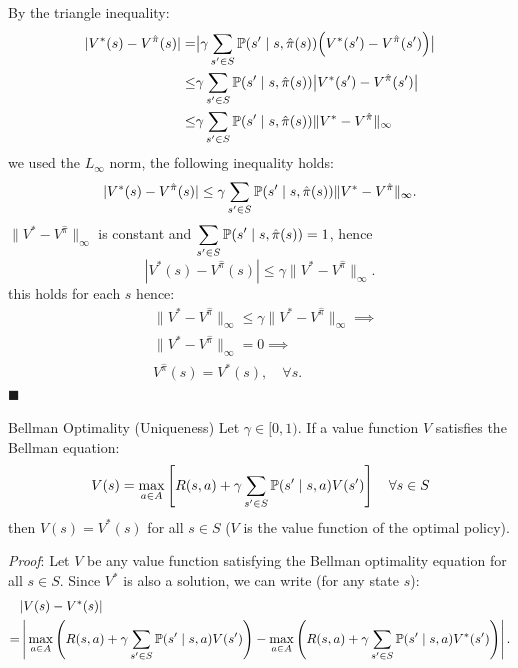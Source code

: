 \documentclass[10pt, a4paper]{report}
\begin{document}
By the triangle inequality:
\begin{align}  
     |V^*(s) - V^{\hat{\pi}}(s)| =&\big\vert{}\gamma \sum_{s' \in {S}} {\mathbb P}(s' \mid s, \hat{\pi}(s)) \Big( V^*(s') - V^{\hat{\pi}}(s') \Big)\big\vert{}\\
    \le&\gamma \sum_{s' \in {S}} {\mathbb P}(s' \mid s, \hat{\pi}(s)) \big\vert{} V^*(s') - V^{\hat{\pi}}(s')\big\vert{}\\ 
    \le&\gamma \sum_{s' \in {S}} {\mathbb P}(s' \mid s, \hat{\pi}(s)) \| V^* - V^{\hat{\pi}}\|_\infty
\end{align}
we used the $L_\infty$ norm, the following inequality holds:
\begin{equation}
    |V^*(s) - V^{\hat{\pi}}(s)| \le \gamma \sum_{s' \in {S}} {\mathbb P}(s' \mid s, \hat{\pi}(s)) \|V^* - V^{\hat{\pi}} \|_\infty.
\end{equation}
$\|V^* - V^{\hat{\pi}} \|_\infty$ is constant and $\displaystyle\sum_{s' \in {S}} {\mathbb P}(s' \mid s, \hat{\pi}(s))=1$, hence
\begin{equation}
    |V^*(s) - V^{\hat{\pi}}(s)| \le \gamma\|V^* - V^{\hat{\pi}} \|_\infty.
\end{equation}
this holds for each $s$ hence:
\begin{align}
    &\|V^* - V^{\hat{\pi}} \|_\infty \le \gamma\|V^* - V^{\hat{\pi}} \|_\infty\implies \\ 
    &\|V^* - V^{\hat{\pi}} \|_\infty=0\implies \\ 
    &V^{\hat{\pi}}(s)=V^*(s), \quad \forall s.
\end{align}
\hfill$\blacksquare$
\begin{boxtheorem}{Bellman Optimality (Uniqueness)}{}
    Let $\gamma\in[0,1)$. If a value function $V$ satisfies the Bellman equation:\begin{equation}
       V(s) = \max_{a \in A} \left[ R(s,a) + \gamma \sum_{s' \in {S}} {\mathbb P}(s' \mid s, a) V(s') \right] \quad \forall s \in {S}
    \end{equation}
    then $V(s)=V^*(s)$ for all $s\in S$ ($V$ is the value function of the optimal policy).
\end{boxtheorem}
\noindent\textit{Proof}: Let $V$  be any value function satisfying the Bellman optimality equation for all $s \in S$. Since $V^*$ is also a solution, we can write (for any state $s$):\begin{align}
    &\vert{}V(s) - V^*(s)\vert{}\\ =&\left\vert{} \max_{a \in {A}} \left( R(s, a) + \gamma \sum_{s' \in {S}} {\mathbb P}(s' \mid s, a) V(s') \right) - \max_{a \in {A}} \left( R(s, a) + \gamma \sum_{s' \in {S}} {\mathbb P}(s' \mid s, a) V^*(s') \right) \right\vert{}. 
\end{align}
\end{document}
